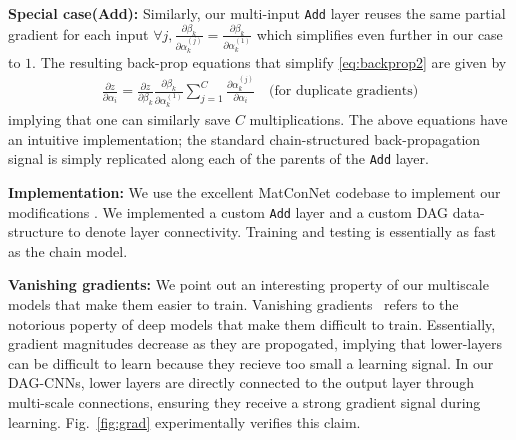 \documentclass[10pt,twocolumn,letterpaper]{article}
\begin{document}
{\bf Special case(Add):} Similarly, our multi-input {\tt Add} layer reuses the same partial gradient for each input
$\forall j, \frac{\partial \beta_k}{\partial \alpha_k^{(j)}} = \frac{\partial \beta_k}{\partial \alpha_k^{(1)}}$ which simplifies even further in our case to $1$. The resulting back-prop equations that simplify \eqref{eq:backprop2} are given by
\begin{align}
\frac{\partial z}{\partial \alpha_i} = \frac{\partial z}{\partial \beta_k} \frac{\partial \beta_k}{\partial \alpha_k^{(1)}}\sum_{j=1}^{C} \frac{\partial \alpha_k^{(j)}}{\partial \alpha_i}  \quad \text{(for duplicate gradients)}
\end{align}
\noindent implying that one can similarly save $C$ multiplications. The above equations have an intuitive implementation; the standard chain-structured back-propagation signal is simply replicated along each of the parents of the {\tt Add} layer.

{\bf Implementation:} We use the excellent MatConNet codebase to implement our modifications \cite{vedaldimatconvnet}. We implemented a custom {\tt Add} layer and a custom DAG data-structure to denote layer connectivity. Training and testing is essentially as fast as the chain model.

{\bf Vanishing gradients:} We point out an interesting property of our multiscale models that make them easier to train. Vanishing gradients~\cite{bengio1994learning} refers to the notorious poperty of deep models that make them difficult to train. Essentially, gradient magnitudes decrease as they are propogated, implying that lower-layers can be difficult to learn because they recieve too small a learning signal. In our DAG-CNNs, lower layers are directly connected to the output layer through multi-scale connections, ensuring they receive a strong gradient signal during learning. Fig.~\ref{fig:grad} experimentally verifies this claim.%
\end{document}
